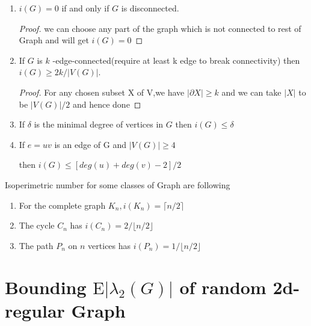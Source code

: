 \documentclass[oneside]{book}
\begin{document}
	\begin{enumerate}
		
		
		\item  $i(G)=0$ if and only if $G$ is disconnected. \par
		\begin{proof}
			we can choose  any part of the graph which is not connected to rest of Graph and will get $i(G)=0$
		\end{proof} \par
		\item  If $G$ is $k$ -edge-connected(require at least k edge to break connectivity) then $i(G) \geq 2 k /|V(G)|$. \par
		\begin{proof}
			
			For any chosen subset X of V,we have  $|\partial X| \geq k$ and we can take $|X|$ to be $|V(G)|/2$ and hence done 
		\end{proof}
		\item  If $\delta$ is the minimal degree of vertices in $G$ then $i(G) \leq\delta$ \par
		\item  If   $e=u v$ is   an  edge  of G  and $|V(G)| \geq 4$ \par then  $i(G) \leq [deg(u)+deg(v)-2] / 2$ \par
	\end{enumerate}
	
	
	
	
	Isoperimetric number for some classes of Graph are following \par
	\begin{enumerate}
		\item   For the complete graph $K_{n}, i\left(K_{n}\right)=\lceil n / 2\rceil$ \par
		\item The cycle $C_{n}$ has $i\left(C_{n}\right)=2 /\lfloor n / 2\rfloor$ \par
		\item  The path $P_{n}$ on $n$ vertices has $i\left(P_{n}\right)=1 /\lfloor n / 2\rfloor$
	\end{enumerate}
	\section{Bounding $\mathrm{E}\left|\lambda_{2}(G)\right|$ of random 2d-regular Graph}
	\label{s:6 }
	
\end{document}
